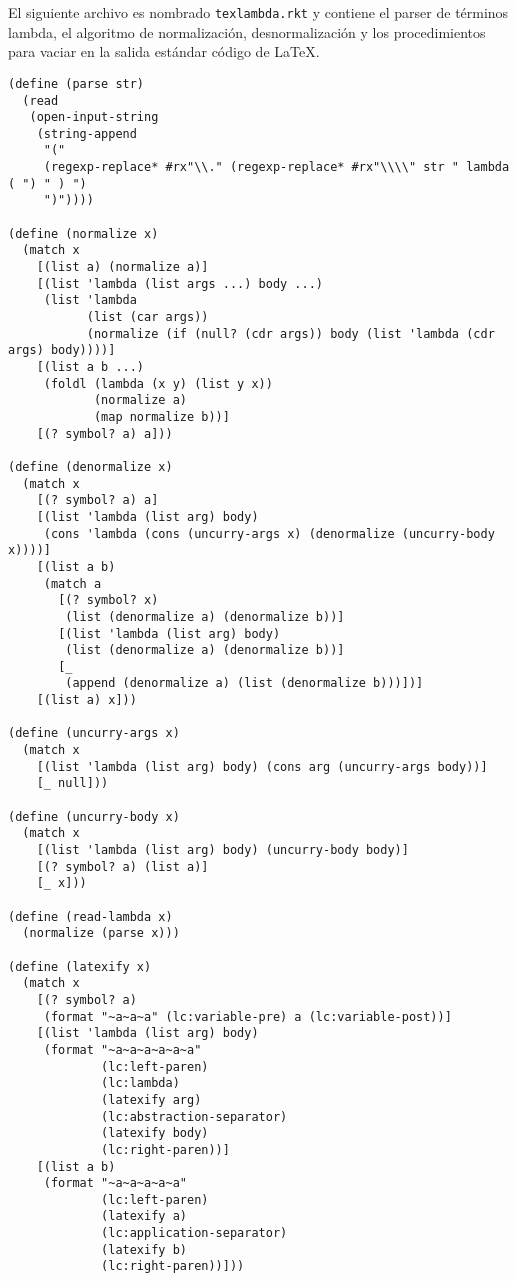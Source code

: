 El siguiente archivo es nombrado \texttt{texlambda.rkt} y contiene el parser de términos lambda, el algoritmo de normalización, desnormalización y los procedimientos para vaciar en la salida estándar código de \LaTeX.

\begin{verbatim}
(define (parse str)
  (read
   (open-input-string
    (string-append
     "("
     (regexp-replace* #rx"\\." (regexp-replace* #rx"\\\\" str " lambda ( ") " ) ")
     ")"))))

(define (normalize x)
  (match x
    [(list a) (normalize a)]
    [(list 'lambda (list args ...) body ...)
     (list 'lambda
           (list (car args))
           (normalize (if (null? (cdr args)) body (list 'lambda (cdr args) body))))]
    [(list a b ...)
     (foldl (lambda (x y) (list y x))
            (normalize a)
            (map normalize b))]
    [(? symbol? a) a]))

(define (denormalize x)
  (match x
    [(? symbol? a) a]
    [(list 'lambda (list arg) body)
     (cons 'lambda (cons (uncurry-args x) (denormalize (uncurry-body x))))]
    [(list a b)
     (match a
       [(? symbol? x)
        (list (denormalize a) (denormalize b))]
       [(list 'lambda (list arg) body)
        (list (denormalize a) (denormalize b))]
       [_
        (append (denormalize a) (list (denormalize b)))])]
    [(list a) x]))

(define (uncurry-args x)
  (match x
    [(list 'lambda (list arg) body) (cons arg (uncurry-args body))]
    [_ null]))

(define (uncurry-body x)
  (match x
    [(list 'lambda (list arg) body) (uncurry-body body)]
    [(? symbol? a) (list a)]
    [_ x]))

(define (read-lambda x)
  (normalize (parse x)))

(define (latexify x)
  (match x
    [(? symbol? a)
     (format "~a~a~a" (lc:variable-pre) a (lc:variable-post))]
    [(list 'lambda (list arg) body)
     (format "~a~a~a~a~a~a"
             (lc:left-paren)
             (lc:lambda)
             (latexify arg)
             (lc:abstraction-separator)
             (latexify body)
             (lc:right-paren))]
    [(list a b)
     (format "~a~a~a~a~a"
             (lc:left-paren)
             (latexify a)
             (lc:application-separator)
             (latexify b)
             (lc:right-paren))]))


\end{verbatim}
